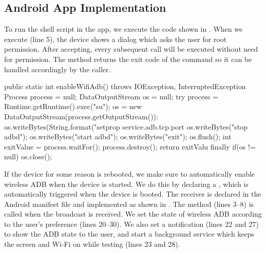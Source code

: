 
\subsection{Android App Implementation}
To run the shell script in the app, we execute the code shown in . When we execute  (line 5), the device shows a dialog which asks the user for root permission. After accepting, every subsequent  call will be executed without need for permission. The method returns the exit code of the command so it can be handled accordingly by the caller.
\begin{javacode}[float=tb,label=lst:android_app_shell,caption=Enable wireless ADB in Android]
public static int enableWifiAdb() throws IOException, InterruptedException {
  Process process = null;
  DataOutputStream os = null;
  try {
    process = Runtime.getRuntime().exec("su");
    os = new DataOutputStream(process.getOutputStream());
    os.writeBytes(String.format("setprop service.adb.tcp.port %
    os.writeBytes("stop adbd\n");
    os.writeBytes("start adbd\n");
    os.writeBytes("exit\n");
    os.flush();
    int exitValue = process.waitFor();
    process.destroy();
    return exitValu
  } finally {
    if(os != null) {
      os.close();
    }
  }
}
\end{javacode}
If the device for some reason is rebooted, we make sure to automatically enable wireless ADB when the device is started. We do this by declaring a , which is automatically triggered when the device is booted. The receiver is declared in the Android manifest file and implemented as shown in . The  method (lines 3--8) is called when the broadcast is received. We set the state of wireless ADB according to the user's preference (lines 20--30). We also set a notification (lines 22 and 27) to show the ADB state to the user, and start a background service which keeps the screen and Wi-Fi on while testing (lines 23 and 28).

